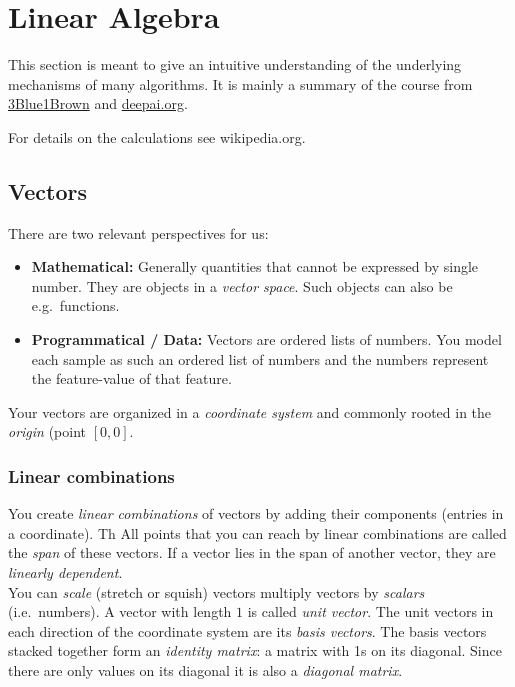 \documentclass[
]{book}
\begin{document}
\hypertarget{linear-algebra}{%
\section{Linear Algebra}\label{linear-algebra}}

This section is meant to give an intuitive understanding of the
underlying mechanisms of many algorithms. It is mainly a summary of the
course from
\href{https://youtube.com/playlist?list=PLZHQObOWTQDPD3MizzM2xVFitgF8hE_ab}{3Blue1Brown}
and
\href{https://deepai.org/machine-learning-glossary-and-terms/vector}{deepai.org}.

For details on the calculations see wikipedia.org.

\hypertarget{vectors}{%
\subsection{Vectors}\label{vectors}}

There are two relevant perspectives for us:

\begin{itemize}
\item
  \textbf{Mathematical:} Generally quantities that cannot be expressed by
  single number. They are objects in a \emph{vector space}. Such objects
  can also be e.g.~functions.
\item
  \textbf{Programmatical / Data:} Vectors are ordered lists of numbers. You
  model each sample as such an ordered list of numbers and the numbers
  represent the feature-value of that feature.
\end{itemize}

Your vectors are organized in a \emph{coordinate system} and commonly rooted
in the \emph{origin} (point \([0,0]\).\\

\hypertarget{linear-combinations}{%
\subsubsection{Linear combinations}\label{linear-combinations}}

You create \emph{linear combinations} of vectors by adding their components
(entries in a coordinate). Th All points that you can reach by linear
combinations are called the \emph{span} of these vectors. If a vector lies in
the span of another vector, they are \emph{linearly dependent}.\\
You can \emph{scale} (stretch or squish) vectors multiply vectors by
\emph{scalars} (i.e.~numbers). A vector with length \(1\) is called \emph{unit
vector}. The unit vectors in each direction of the coordinate system are
its \emph{basis vectors}. The basis vectors stacked together form an
\emph{identity matrix}: a matrix with 1s on its diagonal. Since there are
only values on its diagonal it is also a \emph{diagonal matrix}.\\
\end{document}
